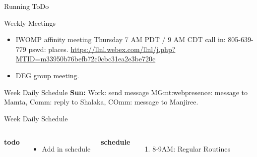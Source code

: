 \documentclass[serif, mathserif, final]{beamer}
\begin{document}
\begin{frame}
\begin{columns}
\begin{column}{0.5\linewidth}
\begin{block}{Running ToDo}
\begin{enumerate}
    \end{enumerate}
  \end{block}

  \begin{block}{Weekly Meetings}
    \begin{itemize}
      \tiny \item \tiny IWOMP affinity meeting Thursday 7 AM PDT / 9 AM
      CDT call in: 805-639-779 pswd: places. \url{https://llnl.webex.com/llnl/j.php?MTID=m33950b76befb72c0cbc31ea2e3be720c}
    \item \tiny DEG group meeting.  
    \end{itemize}
  \end{block} 

  \begin{block}{Week Daily Schedule} %
    {\bf Sun:} Work: send message MGmt:webpresence: message to Mamta, Comm: reply to Shalaka, COmm:
    message to Manjiree. 
  \end{block} 

  \begin{block}{Week Daily Schedule}

    \begin{columns}
         {\small \bf todo}\\ 
        \begin{itemize}
          \tiny \item \tiny Add in schedule
        \end{itemize} 
        \textbf{\small schedule}\\
        \begin{enumerate} 
          \tiny \item \tiny 8-9AM: Regular Routines 
        \end{enumerate}


\end{columns}
\end{block}
\end{column}
\end{columns}
\end{frame}
\end{document}
